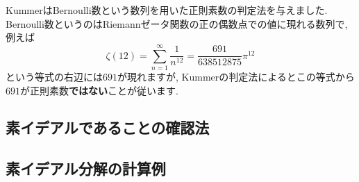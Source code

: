 \documentclass[11pt,b5paper,oneside,titlepage,lualatex]{ltjsreport}
\begin{document}
KummerはBernoulli数という数列を用いた正則素数の判定法を与えました. 
Bernoulli数というのはRiemannゼータ関数の正の偶数点での値に現れる数列で, 例えば
\[
\zeta(12) = \sum_{n=1}^{\infty} \frac{1}{n^{12}} = \frac{691}{638512875} \pi^{12}
\]
という等式の右辺には$ 691 $が現れますが, Kummerの判定法によるとこの等式から$ 691 $が正則素数\textbf{ではない}ことが従います. 


\section{素イデアルであることの確認法} \label{sec:素イデアルであることの確認法}






\section{素イデアル分解の計算例} \label{sec:素イデアル分解の計算例}







\clearpage






\chapter{} \label{chap:}






\section{} \label{sec:}

\end{document}
